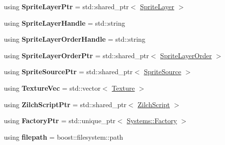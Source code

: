 \begin{DoxyCompactItemize}
\item 
\hypertarget{namespaceDCEngine_a58479aef997cfa44cac6e4b4dd28ad5d}{using {\bfseries Sprite\-Layer\-Ptr} = std\-::shared\-\_\-ptr$<$ \hyperlink{classDCEngine_1_1SpriteLayer}{Sprite\-Layer} $>$}\label{namespaceDCEngine_a58479aef997cfa44cac6e4b4dd28ad5d}

\item 
\hypertarget{namespaceDCEngine_a5e33d726ac91c2981ed8498c489d8f92}{using {\bfseries Sprite\-Layer\-Handle} = std\-::string}\label{namespaceDCEngine_a5e33d726ac91c2981ed8498c489d8f92}

\item 
\hypertarget{namespaceDCEngine_a5fca000f6a185eef07e3a5eb98fa33fd}{using {\bfseries Sprite\-Layer\-Order\-Handle} = std\-::string}\label{namespaceDCEngine_a5fca000f6a185eef07e3a5eb98fa33fd}

\item 
\hypertarget{namespaceDCEngine_a232b27e36bc26d90f63dbab1b30db55f}{using {\bfseries Sprite\-Layer\-Order\-Ptr} = std\-::shared\-\_\-ptr$<$ \hyperlink{classDCEngine_1_1SpriteLayerOrder}{Sprite\-Layer\-Order} $>$}\label{namespaceDCEngine_a232b27e36bc26d90f63dbab1b30db55f}

\item 
\hypertarget{namespaceDCEngine_a557e7662165a9e23d463e3933f610bca}{using {\bfseries Sprite\-Source\-Ptr} = std\-::shared\-\_\-ptr$<$ \hyperlink{classDCEngine_1_1SpriteSource}{Sprite\-Source} $>$}\label{namespaceDCEngine_a557e7662165a9e23d463e3933f610bca}

\item 
\hypertarget{namespaceDCEngine_a89a2bd1962b8c3b0b0b50860cfb7e5ff}{using {\bfseries Texture\-Vec} = std\-::vector$<$ \hyperlink{classDCEngine_1_1Texture}{Texture} $>$}\label{namespaceDCEngine_a89a2bd1962b8c3b0b0b50860cfb7e5ff}

\item 
\hypertarget{namespaceDCEngine_a6b79e53733bdb4f0e3b630b16f4a3266}{using {\bfseries Zilch\-Script\-Ptr} = std\-::shared\-\_\-ptr$<$ \hyperlink{classDCEngine_1_1ZilchScript}{Zilch\-Script} $>$}\label{namespaceDCEngine_a6b79e53733bdb4f0e3b630b16f4a3266}

\item 
\hypertarget{namespaceDCEngine_ae40eb71c9cc7bae29eddae6cbdda70de}{using {\bfseries Factory\-Ptr} = std\-::unique\-\_\-ptr$<$ \hyperlink{classDCEngine_1_1Systems_1_1Factory}{Systems\-::\-Factory} $>$}\label{namespaceDCEngine_ae40eb71c9cc7bae29eddae6cbdda70de}

\item 
\hypertarget{namespaceDCEngine_a063d2e816e54d840d6f61061c0499ef7}{using {\bfseries filepath} = boost\-::filesystem\-::path}\label{namespaceDCEngine_a063d2e816e54d840d6f61061c0499ef7}


\end{DoxyCompactItemize}

